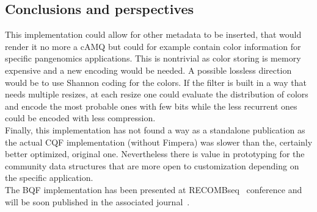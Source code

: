 \subsection{Conclusions and perspectives}
This implementation could allow for other metadata to be inserted, that would render it no more a cAMQ but could for example contain color information for specific pangenomics applications. This is nontrivial as color storing is memory expensive and a new encoding would be needed. A possible lossless direction would be to use Shannon coding for the colors. If the filter is built in a way that needs multiple resizes, at each resize one could evaluate the distribution of colors and encode the most probable ones with few bits while the less recurrent ones could be encoded with less compression. \\
Finally, this implementation has not found a way as a standalone publication as the actual CQF implementation (without Fimpera) was slower than the, certainly better optimized, original one.
Nevertheless there is value in prototyping for the community data structures that are more open to customization depending on the specific application.\\
The BQF implementation has been presented at RECOMBseq~\cite{recombseq} conference and will be soon published in the associated journal~\cite{bqf}.

